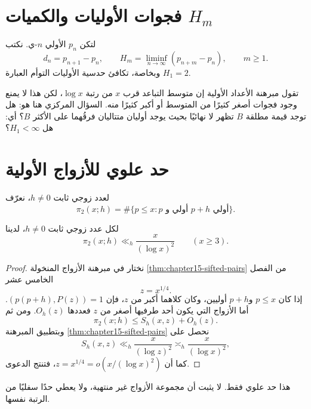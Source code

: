 \section{فجوات الأوليات والكميات \(H_m\)}

\begin{definition}
\label{def:chapter16-prime-gaps}
لتكن \(p_n\) الأولي \(n\)-ي. نكتب
\[
 d_n=p_{n+1}-p_n,
\qquad
 H_m=\liminf_{n\to\infty}(p_{n+m}-p_n),
\qquad m\ge1.
\]
وبخاصة، تكافئ حدسية الأوليات التوأم العبارة \(H_1=2\).
\end{definition}

تقول مبرهنة الأعداد الأولية إن متوسط التباعد قرب \(x\) من رتبة \(\log x\)، لكن
هذا لا يمنع وجود فجوات أصغر كثيرًا من المتوسط أو أكبر كثيرًا منه. السؤال المركزي
هنا هو: هل توجد قيمة مطلقة \(B\) تظهر لا نهائيًا بحيث يوجد أوليان متتاليان فرقُهما
على الأكثر \(B\)؟ أي: هل \(H_1<\infty\)؟

\section{حد علوي للأزواج الأولية}

لعدد زوجي ثابت \(h\ne0\)، نعرّف
\[
 \pi_2(x;h)
 =
 \#\{p\le x: p\text{ أولي و }p+h\text{ أولي}\}.
\]

\begin{theorem}
\label{thm:chapter16-prime-pair-upper-bound}
\provedhere
لكل عدد زوجي ثابت \(h\ne0\)، لدينا
\[
 \pi_2(x;h)\ll_h \frac{x}{(\log x)^2}
 \qquad (x\ge3).
\]
\end{theorem}

\begin{proof}
نختار في مبرهنة الأزواج المنخولة
\ref{thm:chapter15-sifted-pairs} من الفصل الخامس عشر
\[
 z=x^{1/4}.
\]
إذا كان \(p\le x\) و\(p+h\) أوليين، وكان كلاهما أكبر من \(z\)، فإن
\((p(p+h),P(z))=1\). أما الأزواج التي يكون أحد طرفيها أصغر من \(z\) فعددها
\(O_h(z)\). ومن ثم
\[
 \pi_2(x;h)
 \le
 S_h(x,z)+O_h(z).
\]
وبتطبيق المبرهنة \ref{thm:chapter15-sifted-pairs} نحصل على
\[
 S_h(x,z)\ll_h\frac{x}{(\log z)^2}
 \asymp_h\frac{x}{(\log x)^2},
\]
كما أن \(z=x^{1/4}=o(x/(\log x)^2)\)، فتنتج الدعوى.
\end{proof}

هذا حد علوي فقط. لا يثبت أن مجموعة الأزواج غير منتهية، ولا يعطي حدًا سفليًا من
الرتبة نفسها.

